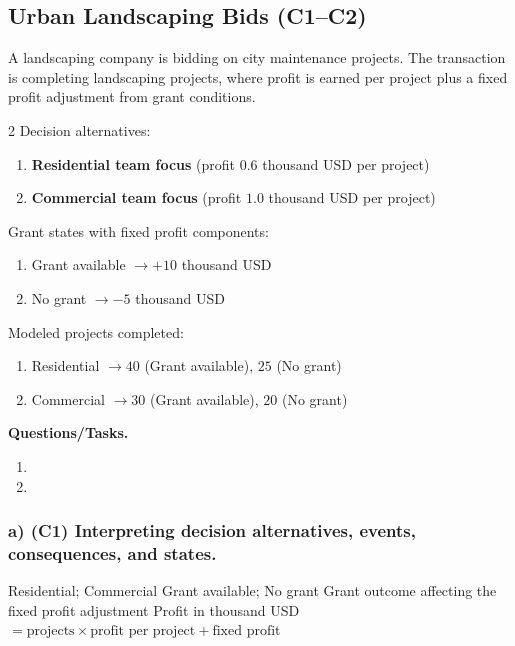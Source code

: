 	\subsection{Urban Landscaping Bids (C1--C2)}
	\label{sec:problem19-urban-landscaping-bids-c1-c2}
	A landscaping company is bidding on city maintenance projects. The transaction is completing landscaping projects, where profit is earned per project plus a fixed profit adjustment from grant conditions.
	
	\begin{multicols}{2}
		Decision alternatives:
		\begin{enumerate}[label=\arabic*.]
			\item \textbf{Residential team focus} (profit $0.6$ thousand USD per project)
			\item \textbf{Commercial team focus} (profit $1.0$ thousand USD per project)
		\end{enumerate}
	
		Grant states with fixed profit components:
		\begin{enumerate}[label=\arabic*.]
			\item Grant available $\to +10$ thousand USD
			\item No grant $\to -5$ thousand USD
		\end{enumerate}
	
			\columnbreak
	
		Modeled projects completed:
		\begin{enumerate}[label=\arabic*.]
			\item Residential $\to 40$ (Grant available), $25$ (No grant)
			\item Commercial $\to 30$ (Grant available), $20$ (No grant)
		\end{enumerate}
	\end{multicols}

	\textbf{Questions/Tasks.}
	\begin{enumerate}[label=\textbf{\alph*)}]
		\item {}
		\item {}
	\end{enumerate}
	
	\subsubsection*{a) \textbf{(C1)} Interpreting decision alternatives, events, consequences, and states.}
	\label{subsec:problem19-urban-landscaping-bids-c1}
	\DecisionElementsTable
	{Residential; Commercial}
	{Grant available; No grant}
	{Grant outcome affecting the fixed profit adjustment}
	{Profit in thousand USD $= \text{projects} \times \text{profit per project} + \text{fixed profit}$}
	
